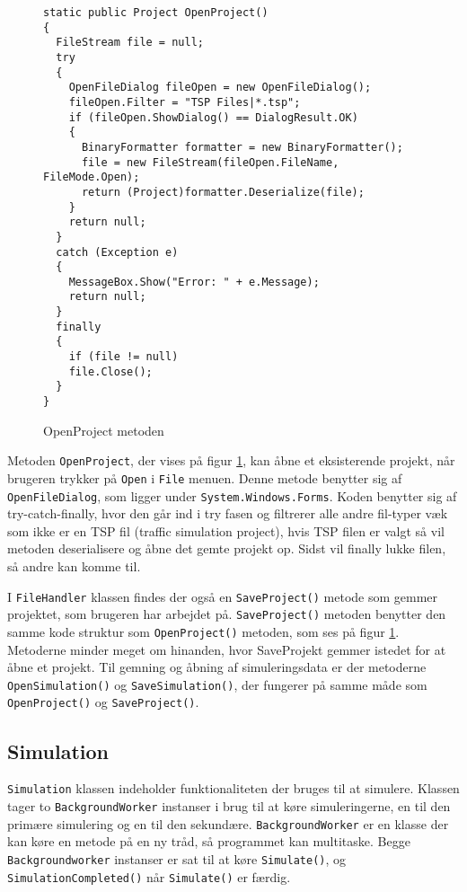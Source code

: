 \begin{figure}[H]
\begin{lstlisting}
static public Project OpenProject()
{
  FileStream file = null;
  try
  {
    OpenFileDialog fileOpen = new OpenFileDialog();
    fileOpen.Filter = "TSP Files|*.tsp";
    if (fileOpen.ShowDialog() == DialogResult.OK)
    {
      BinaryFormatter formatter = new BinaryFormatter();
      file = new FileStream(fileOpen.FileName, FileMode.Open);
      return (Project)formatter.Deserialize(file);
    }
    return null;
  }
  catch (Exception e)
  {
    MessageBox.Show("Error: " + e.Message);
    return null;
  }
  finally
  {
    if (file != null)
    file.Close();
  }
}
\end{lstlisting}
\caption{OpenProject metoden}\label{OpenProjectCode}
\end{figure}

Metoden \texttt{OpenProject}, der vises på figur \ref{OpenProjectCode}, kan åbne et eksisterende projekt, når brugeren trykker på \texttt{Open} i \texttt{File} menuen. Denne metode benytter sig af \texttt{OpenFileDialog}, som ligger under \texttt{System.Windows.Forms}. Koden benytter sig af try-catch-finally, hvor den går ind i try fasen og filtrerer alle andre fil-typer væk som ikke er en TSP fil (traffic simulation project), hvis TSP filen er valgt så vil metoden deserialisere og åbne det gemte projekt op. Sidst vil finally lukke filen, så andre kan komme til.

\vspace{5mm}

I \texttt{FileHandler} klassen findes der også en \texttt{SaveProject()} metode som gemmer projektet, som brugeren har arbejdet på. \texttt{SaveProject()} metoden benytter den samme kode struktur som \texttt{OpenProject()} metoden, som ses på figur \ref{OpenProjectCode}. Metoderne minder meget om hinanden, hvor SaveProjekt gemmer istedet for at åbne et projekt. Til gemning og åbning af simuleringsdata er der metoderne \texttt{OpenSimulation()} og \texttt{SaveSimulation()}, der fungerer på samme måde som \texttt{OpenProject()} og \texttt{SaveProject()}.

\subsection{Simulation}\label{SimulationClass}
\texttt{Simulation} klassen indeholder funktionaliteten der bruges til at simulere. Klassen tager to \texttt{BackgroundWorker} instanser i brug til at køre simuleringerne, en til den primære simulering og en til den sekundære. \texttt{BackgroundWorker} er en klasse der kan køre en metode på en ny tråd, så programmet kan multitaske. Begge \texttt{Backgroundworker} instanser er sat til at køre \texttt{Simulate()}, og \texttt{SimulationCompleted()} når \texttt{Simulate()} er færdig. 


